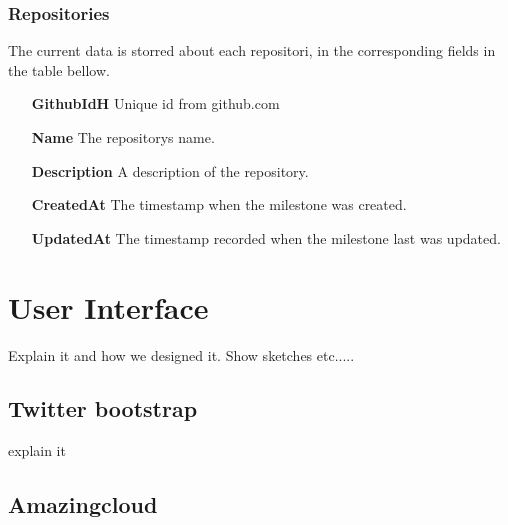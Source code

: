 \subsubsection*{Repositories}
The current data is storred about each repositori, in the corresponding fields in the table bellow.
\vspace{0.5cm}
\begin{itemize}
    \item[\textbf{GithubIdH}]{Unique id from github.com}
    \item[\textbf{Name}]{The repositorys name.}
    \item[\textbf{Description}]{A description of the repository.}
    \item[\textbf{CreatedAt}]{The timestamp when the milestone was created.}
    \item[\textbf{UpdatedAt}]{The timestamp recorded when the milestone last was updated.}
\end{itemize}
\vspace{0.5cm}

\section{User Interface}
Explain it and how we designed it. Show sketches etc.....

\subsection{Twitter bootstrap}
explain it

\subsection{Amazingcloud}